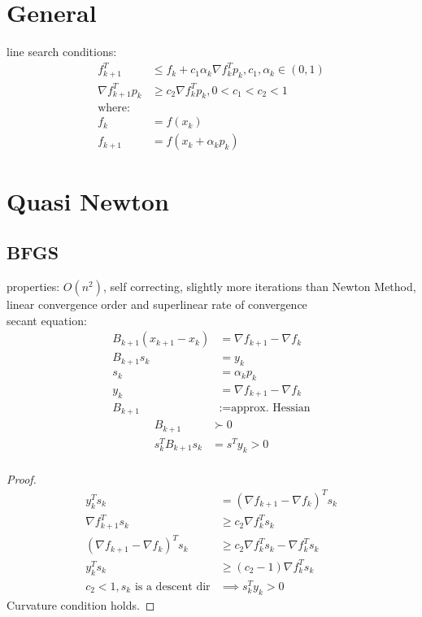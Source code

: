 \documentclass[8pt,letter]{article}
\begin{document}

\begin{multicols*}{2}

  \section{General}

  line search conditions:
  \begin{align}
    f_{k+1}^T & \leq f_k + c_1 \alpha_k \nabla f_k^T p_k, c_1,\alpha_k \in (0,1)\\
    \nabla f_{k+1}^T p_k & \geq c_2 \nabla f_k^T p_k, 0<c_1<c_2<1\\
    \text{where}:&\\
    f_{k} & = f(x_k)\\
    f_{k+1} & = f(x_k+\alpha_k p_k)
  \end{align}

  \section{Quasi Newton}

  \subsection{BFGS}
  properties: $O(n^2)$, self correcting, slightly more iterations than Newton Method, linear convergence order and superlinear rate of convergence\\
  
  secant equation:
  \begin{align*}
    B_{k+1}(x_{k+1}-x_k) & =\nabla f_{k+1} - \nabla f_k\\
    B_{k+1} s_k & = y_k\\
    s_k & = \alpha_k p_k\\
    y_k & = \nabla f_{k+1} - \nabla f_k\\
    B_{k+1} &:= \text{approx. Hessian}
  \end{align*}
  \begin{align*}
    B_{k+1} & \succ 0\\
    s_k^T B_{k+1} s_k & = s^T y_k > 0\\
  \end{align*}    
  \begin{proof}
    \begin{align*}
      y_k^T s_k & = (\nabla f_{k+1} - \nabla f_k)^T s_k\\
      \nabla f_{k+1}^T s_k & \geq c_2 \nabla f_k^T s_k\\
      (\nabla f_{k+1} - \nabla f_k)^T s_k & \geq c_2 \nabla f_k^T s_k - \nabla f_k^T s_k\\
      y_k^T s_k & \geq (c_2-1) \nabla f_k^T s_k\\
      c_2 < 1, s_k \text{ is a descent dir}& \implies s_k^T y_k > 0
    \end{align*}
    Curvature condition holds.
  \end{proof}


\end{multicols*}
\end{document}
